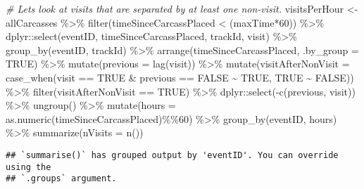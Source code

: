 \documentclass[
]{article}
\newenvironment{Shaded}{\begin{snugshade}}{\end{snugshade}}
\newcommand{\AttributeTok}[1]{\textcolor[rgb]{0.77,0.63,0.00}{#1}}
\newcommand{\CommentTok}[1]{\textcolor[rgb]{0.56,0.35,0.01}{\textit{#1}}}
\newcommand{\ConstantTok}[1]{\textcolor[rgb]{0.00,0.00,0.00}{#1}}
\newcommand{\DecValTok}[1]{\textcolor[rgb]{0.00,0.00,0.81}{#1}}
\newcommand{\FunctionTok}[1]{\textcolor[rgb]{0.00,0.00,0.00}{#1}}
\newcommand{\NormalTok}[1]{#1}
\newcommand{\OtherTok}[1]{\textcolor[rgb]{0.56,0.35,0.01}{#1}}
\newcommand{\SpecialCharTok}[1]{\textcolor[rgb]{0.00,0.00,0.00}{#1}}
\begin{document}
\begin{Shaded}
\begin{Highlighting}[]
\CommentTok{\# Let\textquotesingle{}s look at visits that are separated by at least one non{-}visit.}
\NormalTok{visitsPerHour }\OtherTok{\textless{}{-}}\NormalTok{ allCarcasses }\SpecialCharTok{\%\textgreater{}\%}
  \FunctionTok{filter}\NormalTok{(timeSinceCarcassPlaced }\SpecialCharTok{\textless{}}\NormalTok{ (maxTime}\SpecialCharTok{*}\DecValTok{60}\NormalTok{)) }\SpecialCharTok{\%\textgreater{}\%}
\NormalTok{  dplyr}\SpecialCharTok{::}\FunctionTok{select}\NormalTok{(eventID, timeSinceCarcassPlaced, trackId, visit) }\SpecialCharTok{\%\textgreater{}\%}
  \FunctionTok{group\_by}\NormalTok{(eventID, trackId) }\SpecialCharTok{\%\textgreater{}\%}
  \FunctionTok{arrange}\NormalTok{(timeSinceCarcassPlaced, }\AttributeTok{.by\_group =} \ConstantTok{TRUE}\NormalTok{) }\SpecialCharTok{\%\textgreater{}\%}
  \FunctionTok{mutate}\NormalTok{(}\AttributeTok{previous =} \FunctionTok{lag}\NormalTok{(visit)) }\SpecialCharTok{\%\textgreater{}\%}
  \FunctionTok{mutate}\NormalTok{(}\AttributeTok{visitAfterNonVisit =} \FunctionTok{case\_when}\NormalTok{(visit }\SpecialCharTok{==} \ConstantTok{TRUE} \SpecialCharTok{\&}\NormalTok{ previous }\SpecialCharTok{==} \ConstantTok{FALSE} \SpecialCharTok{\textasciitilde{}} \ConstantTok{TRUE}\NormalTok{,}
                                        \ConstantTok{TRUE} \SpecialCharTok{\textasciitilde{}} \ConstantTok{FALSE}\NormalTok{)) }\SpecialCharTok{\%\textgreater{}\%}
  \FunctionTok{filter}\NormalTok{(visitAfterNonVisit }\SpecialCharTok{==} \ConstantTok{TRUE}\NormalTok{) }\SpecialCharTok{\%\textgreater{}\%}
\NormalTok{  dplyr}\SpecialCharTok{::}\FunctionTok{select}\NormalTok{(}\SpecialCharTok{{-}}\FunctionTok{c}\NormalTok{(previous, visit)) }\SpecialCharTok{\%\textgreater{}\%}
  \FunctionTok{ungroup}\NormalTok{() }\SpecialCharTok{\%\textgreater{}\%}
  \FunctionTok{mutate}\NormalTok{(}\AttributeTok{hours =} \FunctionTok{as.numeric}\NormalTok{(timeSinceCarcassPlaced)}\SpecialCharTok{\%\%}\DecValTok{60}\NormalTok{) }\SpecialCharTok{\%\textgreater{}\%}
  \FunctionTok{group\_by}\NormalTok{(eventID, hours) }\SpecialCharTok{\%\textgreater{}\%}
  \FunctionTok{summarize}\NormalTok{(}\AttributeTok{nVisits =} \FunctionTok{n}\NormalTok{())}
\end{Highlighting}
\end{Shaded}

\begin{verbatim}
## `summarise()` has grouped output by 'eventID'. You can override using the
## `.groups` argument.
\end{verbatim}
\end{document}
